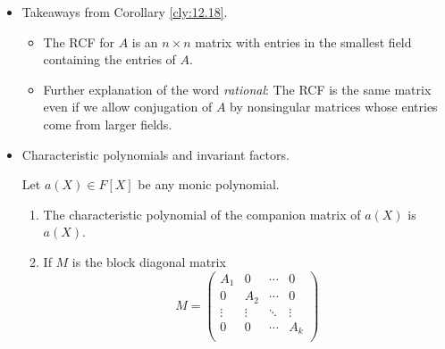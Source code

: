 \documentclass[../notes.tex]{subfiles}
\begin{document}
\begin{itemize}
\begin{corollary}
        \begin{enumerate}
            \item The rational canonical form of $A$ is the same whether it is computed over $K$ or over $F$. The minimal and characteristic polynomials and the invariant factors of $A$ are the same whether $A$ is considered as a matrix over $F$ or as a matrix over $K$.
            \item The matrices $A,B$ are similar over $K$ iff they are similar over $F$, i.e., there exists an invertible $n\times n$ matrix $P$ with entries from $K$ such that $B=P^{-1}AP$ iff there exists an (in general different) invertible $n\times n$ matrix $Q$ with entries from $F$ such that $B=Q^{-1}AQ$.
        \end{enumerate}
        \begin{proof}
            Given.
        \end{proof}
    \end{corollary}
    \item Takeaways from Corollary \ref{cly:12.18}.
    \begin{itemize}
        \item The RCF for $A$ is an $n\times n$ matrix with entries in the smallest field containing the entries of $A$.
        \item Further explanation of the word \emph{rational}: The RCF is the same matrix even if we allow conjugation of $A$ by nonsingular matrices whose entries come from larger fields.
    \end{itemize}
    \item Characteristic polynomials and invariant factors.
    \begin{lemma}\label{lem:12.19}
        Let $a(X)\in F[X]$ be any monic polynomial.
        \begin{enumerate}
            \item The characteristic polynomial of the companion matrix of $a(X)$ is $a(X)$.
            \item If $M$ is the block diagonal matrix
            \begin{equation*}
                M =
                \begin{pmatrix}
                    A_1 & 0 & \cdots & 0\\
                    0 & A_2 & \cdots & 0\\
                    \vdots & \vdots & \ddots & \vdots\\
                    0 & 0 & \cdots & A_k\\

\end{pmatrix}
\end{equation*}
\end{enumerate}
\end{lemma}
\end{itemize}
\end{document}
